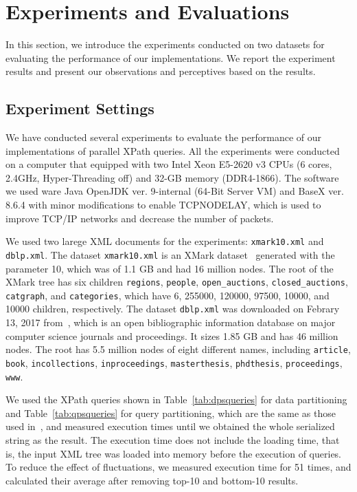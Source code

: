 \def \t#1{t$_#1$}

\section{Experiments and Evaluations}
\label{sect:exper}

In this section, we introduce the experiments conducted on two datasets for
evaluating the performance of our implementations. We report the experiment
results and present our observations and perceptives based on the results.


\subsection{Experiment Settings}

We have conducted several experiments to evaluate the performance of our
implementations of parallel XPath queries. All the experiments were conducted on
a computer that equipped with two Intel Xeon E5-2620 v3 CPUs (6 cores, 2.4GHz,
Hyper-Threading off) and 32-GB memory (DDR4-1866). The software we used ware
Java OpenJDK ver. 9-internal (64-Bit Server VM) and BaseX ver. 8.6.4 with minor
modifications to enable TCP\textunderscore NODELAY, which is used to improve
TCP/IP networks and decrease the number of packets.

We used two larege XML documents for the experiments: \texttt{xmark10.xml} and
\texttt{dblp.xml}. The dataset \texttt{xmark10.xml} is an XMark
dataset~\cite{XMark} generated with the parameter 10, which was of 1.1 GB and
had 16 million nodes. The root of the XMark tree has six children
\verb|regions|, \verb|people|, \verb|open_auctions|, \verb|closed_auctions|,
\verb|catgraph|, and \verb|categories|, which have 6, 255000, 120000, 97500,
10000, and 10000 children, respectively. The dataset \texttt{dblp.xml} was
downloaded on Febrary 13, 2017 from~\cite{DBLP}, which is an open bibliographic
information database on major computer science journals and proceedings. It
sizes 1.85 GB and has 46 million nodes. The root has 5.5 million nodes of eight
different names, including  \texttt{article},  \texttt{book},
\texttt{incollections},  \texttt{inproceedings},  \texttt{masterthesis},
\texttt{phdthesis}, \texttt{proceedings},  \texttt{www}.


We used the XPath queries shown in Table~\ref{tab:dpsqueries} for data
partitioning and Table~\ref{tab:qpsqueries} for query partitioning, which are
the same as those used in~\cite{BoLS09}, and measured execution times until we
obtained the whole serialized string as the result. The execution time does not
include the loading time, that is, the input XML tree was loaded into memory
before the execution of queries. To reduce the effect of fluctuations, we
measured execution time for 51 times, and calculated their average after
removing top-10 and bottom-10 results.

